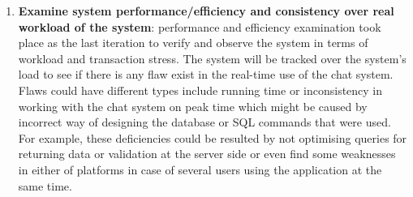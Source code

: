 \documentclass{article}
\begin{document}
\begin{appendices}
\begin{enumerate}
\item \textbf{Examine system performance/efficiency and consistency over real workload of the system}:
performance and efficiency examination took place as the last iteration to verify and observe the system in terms of workload and transaction stress. The system will be tracked over the system's load to see if there is any flaw exist in the real-time use of the chat system. Flaws could have different types include running time or inconsistency in working with the chat system on peak time which might be caused by incorrect way of designing the database or SQL commands that were used. For example, these deficiencies could be resulted by not optimising queries for returning data or validation at the server side or even find some weaknesses in either of platforms in case of several users using the application at the same time.    
\end{enumerate}

\newpage

\end{appendices}
\end{document}
